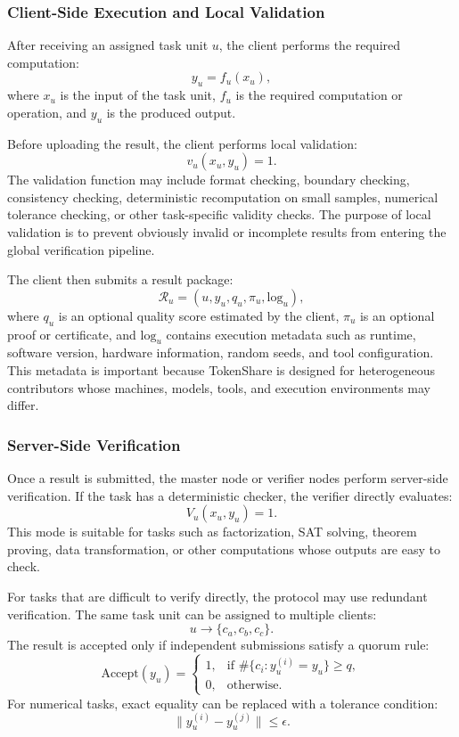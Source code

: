 \documentclass{article}
\theoremstyle{plain}
\begin{document}
\subsubsection{Client-Side Execution and Local Validation}

After receiving an assigned task unit $u$, the client performs the required computation:
\[
y_u = f_u(x_u),
\]
where $x_u$ is the input of the task unit, $f_u$ is the required computation or operation, and $y_u$ is the produced output.

Before uploading the result, the client performs local validation:
\[
v_u(x_u, y_u) = 1.
\]
The validation function may include format checking, boundary checking, consistency checking, deterministic recomputation on small samples, numerical tolerance checking, or other task-specific validity checks. The purpose of local validation is to prevent obviously invalid or incomplete results from entering the global verification pipeline.

The client then submits a result package:
\[
\mathcal{R}_u = (u, y_u, q_u, \pi_u, \mathrm{log}_u),
\]
where $q_u$ is an optional quality score estimated by the client, $\pi_u$ is an optional proof or certificate, and $\mathrm{log}_u$ contains execution metadata such as runtime, software version, hardware information, random seeds, and tool configuration. This metadata is important because TokenShare is designed for heterogeneous contributors whose machines, models, tools, and execution environments may differ.

\subsubsection{Server-Side Verification}

Once a result is submitted, the master node or verifier nodes perform server-side verification. If the task has a deterministic checker, the verifier directly evaluates:
\[
V_u(x_u, y_u) = 1.
\]
This mode is suitable for tasks such as factorization, SAT solving, theorem proving, data transformation, or other computations whose outputs are easy to check.

For tasks that are difficult to verify directly, the protocol may use redundant verification. The same task unit can be assigned to multiple clients:
\[
u \rightarrow \{c_a, c_b, c_c\}.
\]
The result is accepted only if independent submissions satisfy a quorum rule:
\[
\mathrm{Accept}(y_u)=
\begin{cases}
1, & \text{if } \#\{c_i : y_u^{(i)} = y_u\} \geq q,\\
0, & \text{otherwise}.
\end{cases}
\]
For numerical tasks, exact equality can be replaced with a tolerance condition:
\[
\|y_u^{(i)} - y_u^{(j)}\| \leq \epsilon.
\]
\end{document}
